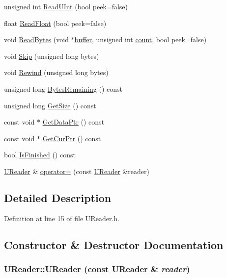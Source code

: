\begin{CompactItemize}
unsigned int \hyperlink{class_u_reader_14d2bfe8a38307b1ecb774b70c910c65}{ReadUInt} (bool peek=false)
\item 
float \hyperlink{class_u_reader_4f6bada39ee0d8bb0378ff7aca8a842e}{ReadFloat} (bool peek=false)
\item 
void \hyperlink{class_u_reader_bd5d03b7bca4540f0cdcfb4226f002ee}{ReadBytes} (void $\ast$\hyperlink{glext__bak_8h_c4fdb15bdbcd63430bab668b5419ed9f}{buffer}, unsigned int \hyperlink{wglext_8h_98d18d6b4e3ba4ed266c6fb54c839d70}{count}, bool peek=false)
\item 
void \hyperlink{class_u_reader_cf514eed848a10b68ad83adc6e6abf37}{Skip} (unsigned long bytes)
\item 
void \hyperlink{class_u_reader_d166b7fd9de8aa1139a221e0287764f5}{Rewind} (unsigned long bytes)
\item 
unsigned long \hyperlink{class_u_reader_dbcd750f18a05e601ac99f80bf3f2179}{BytesRemaining} () const 
\item 
unsigned long \hyperlink{class_u_reader_09963ca355201dfbfdb1cbaddb12f5af}{GetSize} () const 
\item 
const void $\ast$ \hyperlink{class_u_reader_7e140c746fd5dc32e30319621659bb25}{GetDataPtr} () const 
\item 
const void $\ast$ \hyperlink{class_u_reader_0c4c255c273d4c00b12130cab85511e0}{GetCurPtr} () const 
\item 
bool \hyperlink{class_u_reader_82a6582f941b85796993e796222bd759}{IsFinished} () const 
\item 
\hyperlink{class_u_reader}{UReader} \& \hyperlink{class_u_reader_cf1394f05759fba94b4f1abb6f481376}{operator=} (const \hyperlink{class_u_reader}{UReader} \&reader)
\end{CompactItemize}


\subsection{Detailed Description}


Definition at line 15 of file UReader.h.

\subsection{Constructor \& Destructor Documentation}
\hypertarget{class_u_reader_31b2f93dedaa0c00eb914e531c84c692}{
\subsubsection[{UReader}]{\setlength{\rightskip}{0pt plus 5cm}UReader::UReader (const {\bf UReader} \& {\em reader})}}
\label{class_u_reader_31b2f93dedaa0c00eb914e531c84c692}




